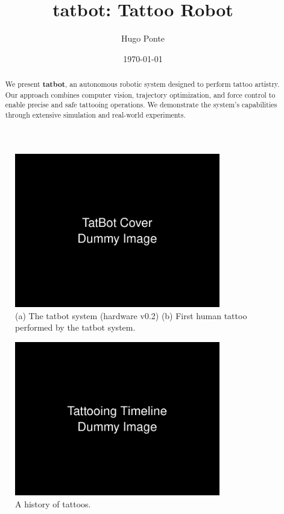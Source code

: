 \documentclass[11pt]{article}
\title{tatbot: Tattoo Robot}
\author{Hugo Ponte}
\date{\today}
\begin{document}
\maketitle

\begin{figure}[h]
    \centering
    \includegraphics[width=0.8\textwidth]{figures/cover.png}
    \caption{(a) The tatbot system (hardware v0.2) (b) First human tattoo performed by the tatbot system. }
    \label{fig:cover}
\end{figure}


\begin{abstract}
We present \textbf{tatbot}, an autonomous robotic system designed to perform tattoo artistry.
Our approach combines computer vision, trajectory optimization, and force control to enable precise and safe tattooing operations.
We demonstrate the system's capabilities through extensive simulation and real-world experiments.
\end{abstract}

\pagebreak

\begin{figure}[h]
    \centering
    \includegraphics[width=0.8\textwidth]{figures/timeline.png}
    \caption{A history of tattoos.}
    \label{fig:timeline}
\end{figure}
\end{document}
